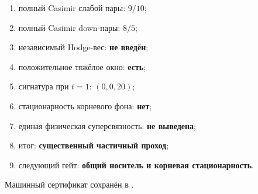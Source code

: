 \begin{protocol}
\begin{enumerate}
 \item полный Casimir слабой пары: \textbf{$9/10$};
 \item полный Casimir down-пары: \textbf{$8/5$};
 \item независимый Hodge-вес: \textbf{не введён};
 \item положительное тяжёлое окно: \textbf{есть};
 \item сигнатура при $t=1$: \textbf{$(0,0,20)$};
 \item стационарность корневого фона: \textbf{нет};
 \item единая физическая суперсвязность: \textbf{не выведена};
 \item итог: \textbf{существенный частичный проход};
 \item следующий гейт: \textbf{общий носитель и корневая стационарность}.
\end{enumerate}
\end{protocol}

Машинный сертификат сохранён в
.